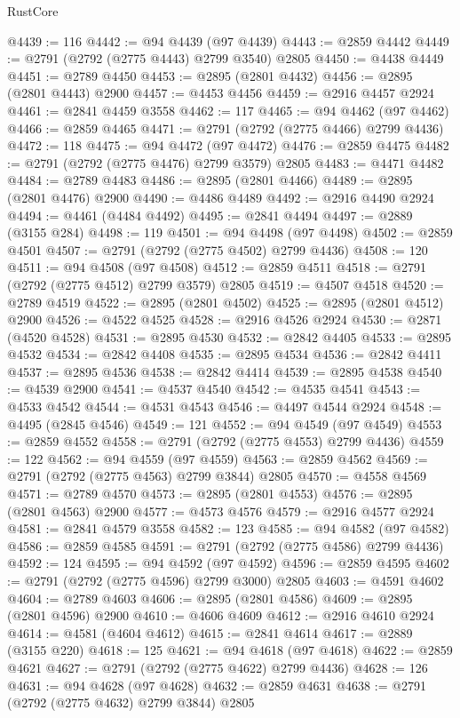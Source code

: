 \begin{lexlean}{RustCore}
\begin{coremodule}
@4439 := 116
@4442 := @94 @4439 (@97 @4439)
@4443 := @2859 @4442
@4449 := @2791 (@2792 (@2775 @4443) @2799 @3540) @2805
@4450 := @4438 @4449
@4451 := @2789 @4450
@4453 := @2895 (@2801 @4432)
@4456 := @2895 (@2801 @4443) @2900
@4457 := @4453 @4456
@4459 := @2916 @4457 @2924
@4461 := @2841 @4459 @3558
@4462 := 117
@4465 := @94 @4462 (@97 @4462)
@4466 := @2859 @4465
@4471 := @2791 (@2792 (@2775 @4466) @2799 @4436)
@4472 := 118
@4475 := @94 @4472 (@97 @4472)
@4476 := @2859 @4475
@4482 := @2791 (@2792 (@2775 @4476) @2799 @3579) @2805
@4483 := @4471 @4482
@4484 := @2789 @4483
@4486 := @2895 (@2801 @4466)
@4489 := @2895 (@2801 @4476) @2900
@4490 := @4486 @4489
@4492 := @2916 @4490 @2924
@4494 := @4461 (@4484 @4492)
@4495 := @2841 @4494
@4497 := @2889 (@3155 @284)
@4498 := 119
@4501 := @94 @4498 (@97 @4498)
@4502 := @2859 @4501
@4507 := @2791 (@2792 (@2775 @4502) @2799 @4436)
@4508 := 120
@4511 := @94 @4508 (@97 @4508)
@4512 := @2859 @4511
@4518 := @2791 (@2792 (@2775 @4512) @2799 @3579) @2805
@4519 := @4507 @4518
@4520 := @2789 @4519
@4522 := @2895 (@2801 @4502)
@4525 := @2895 (@2801 @4512) @2900
@4526 := @4522 @4525
@4528 := @2916 @4526 @2924
@4530 := @2871 (@4520 @4528)
@4531 := @2895 @4530
@4532 := @2842 @4405
@4533 := @2895 @4532
@4534 := @2842 @4408
@4535 := @2895 @4534
@4536 := @2842 @4411
@4537 := @2895 @4536
@4538 := @2842 @4414
@4539 := @2895 @4538
@4540 := @4539 @2900
@4541 := @4537 @4540
@4542 := @4535 @4541
@4543 := @4533 @4542
@4544 := @4531 @4543
@4546 := @4497 @4544 @2924
@4548 := @4495 (@2845 @4546)
@4549 := 121
@4552 := @94 @4549 (@97 @4549)
@4553 := @2859 @4552
@4558 := @2791 (@2792 (@2775 @4553) @2799 @4436)
@4559 := 122
@4562 := @94 @4559 (@97 @4559)
@4563 := @2859 @4562
@4569 := @2791 (@2792 (@2775 @4563) @2799 @3844) @2805
@4570 := @4558 @4569
@4571 := @2789 @4570
@4573 := @2895 (@2801 @4553)
@4576 := @2895 (@2801 @4563) @2900
@4577 := @4573 @4576
@4579 := @2916 @4577 @2924
@4581 := @2841 @4579 @3558
@4582 := 123
@4585 := @94 @4582 (@97 @4582)
@4586 := @2859 @4585
@4591 := @2791 (@2792 (@2775 @4586) @2799 @4436)
@4592 := 124
@4595 := @94 @4592 (@97 @4592)
@4596 := @2859 @4595
@4602 := @2791 (@2792 (@2775 @4596) @2799 @3000) @2805
@4603 := @4591 @4602
@4604 := @2789 @4603
@4606 := @2895 (@2801 @4586)
@4609 := @2895 (@2801 @4596) @2900
@4610 := @4606 @4609
@4612 := @2916 @4610 @2924
@4614 := @4581 (@4604 @4612)
@4615 := @2841 @4614
@4617 := @2889 (@3155 @220)
@4618 := 125
@4621 := @94 @4618 (@97 @4618)
@4622 := @2859 @4621
@4627 := @2791 (@2792 (@2775 @4622) @2799 @4436)
@4628 := 126
@4631 := @94 @4628 (@97 @4628)
@4632 := @2859 @4631
@4638 := @2791 (@2792 (@2775 @4632) @2799 @3844) @2805

\end{coremodule}
\end{lexlean}
